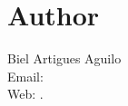 \documentclass[a4paper,english]{article}
\begin{document}
\section{Author}

\noindent
Biel Artigues Aguilo                      \\
Email:   \\
Web: .

\LatexManEnd
\end{document}

